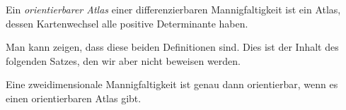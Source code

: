 \begin{definition}
Ein {\em orientierbarer Atlas} einer differenzierbaren Mannigfaltigkeit
ist ein Atlas, dessen Kartenwechsel alle positive Determinante haben.
\end{definition}

Man kann zeigen, dass diese beiden Definitionen sind.
Dies ist der Inhalt des folgenden Satzes, den wir aber nicht
beweisen werden.

\begin{satz}
Eine zweidimensionale Mannigfaltigkeit ist genau dann orientierbar,
wenn es einen orientierbaren Atlas gibt.
\end{satz}


